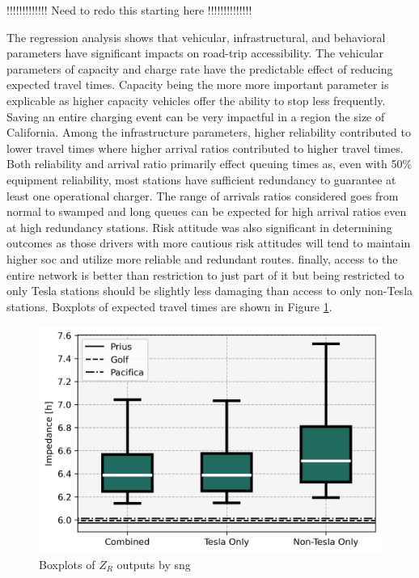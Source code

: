 \begin{multicols}{2}
	
!!!!!!!!!!!!! Need to redo this starting here !!!!!!!!!!!!!!

The regression analysis shows that vehicular, infrastructural, and behavioral parameters have significant impacts on road-trip accessibility. The vehicular parameters of capacity and charge rate have the predictable effect of reducing expected travel times. Capacity being the more more important parameter is explicable as higher capacity vehicles offer the ability to stop less frequently. Saving an entire charging event can be very impactful in a region the size of California. Among the infrastructure parameters, higher reliability contributed to lower travel times where higher arrival ratios contributed to higher travel times. Both reliability and arrival ratio primarily effect queuing times as, even with 50\% equipment reliability, most stations have sufficient redundancy to guarantee at least one operational charger. The range of arrivals ratios considered goes from normal to swamped and long queues can be expected for high arrival ratios even at high redundancy stations. Risk attitude was also significant in determining outcomes as those drivers with more cautious risk attitudes will tend to maintain higher \gls{soc} and utilize more reliable and redundant routes. finally, access to the entire network is better than restriction to just part of it but being restricted to only Tesla stations should be slightly less damaging than access to only non-Tesla stations. Boxplots of expected travel times are shown in Figure \ref{fig:networks_boxplots_impedance}.

\begin{figure}[H]
	\centering
	\includegraphics[width = \linewidth]{figs/Networks_Boxplots_Impedance.png}
	\caption{Boxplots of $Z_R$ outputs by \gls{sng}}
	\label{fig:networks_boxplots_impedance}
\end{figure}


\end{multicols}
